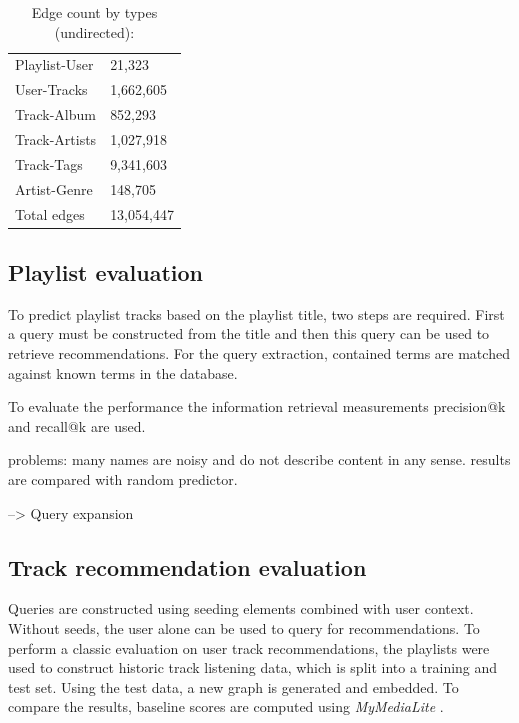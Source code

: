 \documentclass[sigconf]{acmart}
\begin{document}
\begin{table}[H]
	\caption{Edge count by types (undirected):}
	\label{table:edge_count}
	\begin{tabular}{l|l}
		Playlist-User   & 21,323  \\
		User-Tracks     & 1,662,605     \\
		Track-Album		& 852,293 \\
		Track-Artists   & 1,027,918 \\
		Track-Tags   	& 9,341,603 \\
		Artist-Genre	& 148,705  \\\hline
		Total edges 	& 13,054,447
	\end{tabular}
\end{table}


\subsection{Playlist evaluation}
\label{subsec:playlist_eval}
To predict playlist tracks based on the playlist title, two steps are required. First a query must be constructed from the title and then this query can be used to retrieve recommendations. For the query extraction, contained terms are matched against known terms in the database. 
 
 To evaluate the performance the information retrieval measurements precision@k and recall@k are used.

problems: many names are noisy and do not describe content in any sense. results are compared with random predictor.


--> Query expansion







\subsection{Track recommendation evaluation}
\label{subsec:track_rec_eval}
Queries are constructed using seeding elements combined with user context. Without seeds, the user alone can be used to query for recommendations. To perform a classic evaluation on user track recommendations, the playlists were used to construct historic track listening data, which is split into a training and test set. Using the test data, a new graph is generated and embedded. To compare the results, baseline scores are computed using \emph{MyMediaLite} \cite{Gantner2011MyMediaLite}.
\end{document}
